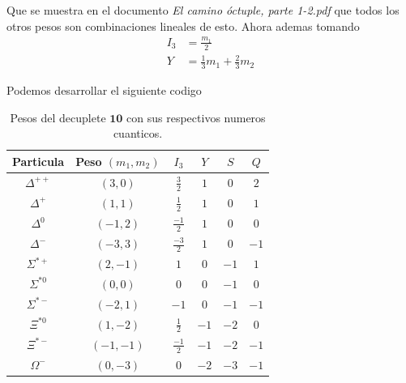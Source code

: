 \documentclass[12pt]{amsart}
\begin{document}
Que se muestra en el documento \textit{El camino óctuple, parte 1-2.pdf} que todos los otros pesos son combinaciones lineales de esto. Ahora ademas tomando
\begin{align*}
  I_3 &= \frac{m_1}{2}\\
  Y &= \frac{1}{3}m_1 + \frac{2}{3}m_2
\end{align*}

Podemos desarrollar el siguiente codigo



\begin{table}[h]
  \centering
  \renewcommand{\arraystretch}{1.5}
  \begin{tabular}{|c|c|c|c|c|c|}
    \hline
    \textbf{Particula} & \textbf{Peso $(m_1, m_2)$} & \textbf{$I_3$} & \textbf{$Y$} & \textbf{$S$} & \textbf{$Q$} \\ \hline
    $\Delta^{++}$ & $(3, 0)$ & $\frac{3}{2}$ & $1$ & $0$ & $2$ \\
    \hline
    $\Delta^{+}$ & $(1, 1)$ & $\frac{1}{2}$ & $1$ & $0$ & $1$ \\
    \hline
    $\Delta^{0}$ & $(-1, 2)$ & $\frac{-1}{2}$ & $1$ & $0$ & $0$ \\
    \hline
    $\Delta^{-}$ & $(-3, 3)$ & $\frac{-3}{2}$ & $1$ & $0$ & $-1$ \\
    \hline
    $\Sigma^{*+}$ & $(2, -1)$ & $1$ & $0$ & $-1$ & $1$ \\
    \hline
    $\Sigma^{*0}$ & $(0, 0)$ & $0$ & $0$ & $-1$ & $0$ \\
    \hline
    $\Sigma^{*-}$ & $(-2, 1)$ & $-1$ & $0$ & $-1$ & $-1$ \\
    \hline
    $\Xi^{*0}$ & $(1, -2)$ & $\frac{1}{2}$ & $-1$ & $-2$ & $0$ \\
    \hline
    $\Xi^{*-}$ & $(-1, -1)$ & $\frac{-1}{2}$ & $-1$ & $-2$ & $-1$ \\
    \hline
    $\Omega^{-}$ & $(0, -3)$ & $0$ & $-2$ & $-3$ & $-1$ \\
    \hline
  \end{tabular}
  \caption{Pesos del decuplete $\mathbf{10}$ con sus respectivos numeros cuanticos.}
  \label{tab:pesos_decuplete}
\end{table}
\end{document}
